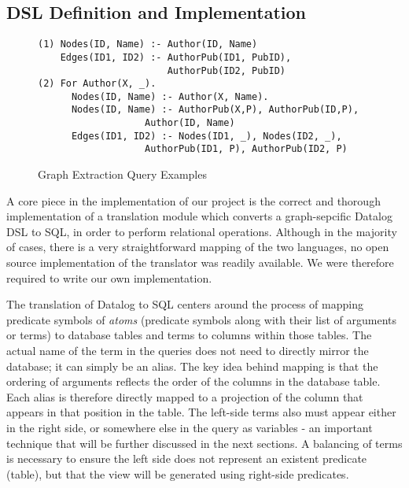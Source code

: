 \documentclass[11pt,letterpaper]{article}
\begin{document}
\subsection*{DSL Definition and Implementation}

\begin{figure}[t]
\centering
\scriptsize
\begin{lstlisting}[breaklines,basicstyle=\ttfamily]
(1) Nodes(ID, Name) :- Author(ID, Name)
    Edges(ID1, ID2) :- AuthorPub(ID1, PubID),
                       AuthorPub(ID2, PubID)
(2) For Author(X, _).
      Nodes(ID, Name) :- Author(X, Name).
      Nodes(ID, Name) :- AuthorPub(X,P), AuthorPub(ID,P),
                   Author(ID, Name)
      Edges(ID1, ID2) :- Nodes(ID1, _), Nodes(ID2, _),
                   AuthorPub(ID1, P), AuthorPub(ID2, P)
\end{lstlisting}
\vspace{-10pt}
\caption{Graph Extraction Query Examples}
\vspace{-10pt}
\label{fig:queries}
\end{figure}

A core piece in the implementation of our project is the correct and thorough implementation of a translation module which converts a graph-sepcific Datalog DSL to SQL, in order to perform relational operations. Although in the majority of cases, there is a very straightforward mapping of the two languages, no open source implementation of the translator was readily available. We were therefore required to write our own implementation.

The translation of Datalog to SQL centers around the process of mapping predicate symbols of \textit{atoms} (predicate symbols along with their list of arguments or terms) to database tables and terms to columns within those tables. The actual name of the term in the queries does not need to directly mirror the database; it can simply be an alias. The key idea behind mapping is that the ordering of arguments reflects the order of the columns in the database table. Each alias is therefore directly mapped to a projection of the column that appears in that position in the table. The left-side terms also must appear either in the right side, or somewhere else in the query as variables - an important technique that will be further discussed in the next sections. A balancing of terms is necessary to ensure the left side does not represent an existent predicate (table), but that the view will be generated using right-side predicates.
\end{document}
